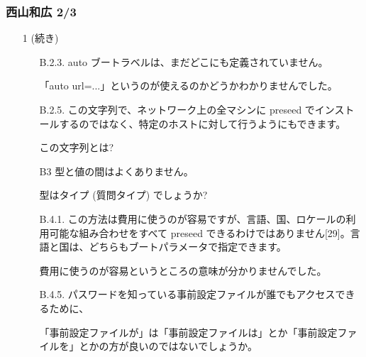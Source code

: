 \documentclass[cjk,dvipdfmx,10pt,compress,%
hyperref={bookmarks=true,bookmarksnumbered=true,bookmarksopen=false,%
colorlinks=false,%
pdftitle={第 69 回 関西 Debian 勉強会},%
pdfauthor={倉敷・のがた・佐々木・かわだ},%
pdfsubject={資料},%
}]{beamer}
\begin{document}
\begin{frame}
  \frametitle{ 西山和広 2/3 }
  \begin{enumerate}
  \item[1] (続き)
    \begin{itemize}
    \item[B.2.3.]
    auto ブートラベルは、まだどこにも定義されていません。
   
    「auto url=...」というのが使えるのかどうかわかりませんでした。

    \item[B.2.5.]
    この文字列で、ネットワーク上の全マシンに preseed でインストールするのではなく、特定のホストに対して行うようにもできます。
   
    この文字列とは?

    \item[B3]
    型と値の間はよくありません。
   
    型はタイプ (質問タイプ) でしょうか?

    \item[B.4.1.]
    この方法は費用に使うのが容易ですが、言語、国、ロケールの利用可能な組み合わせをすべて preseed できるわけではありません[29]。言語と国は、どちらもブートパラメータで指定できます。
   
    費用に使うのが容易というところの意味が分かりませんでした。

    \item[B.4.5.]
    パスワードを知っている事前設定ファイルが誰でもアクセスできるために、
   
    「事前設定ファイルが」は「事前設定ファイルは」とか「事前設定ファイルを」とかの方が良いのではないでしょうか。

    \end{itemize}
  \end{enumerate}
\end{frame}
\end{document}
